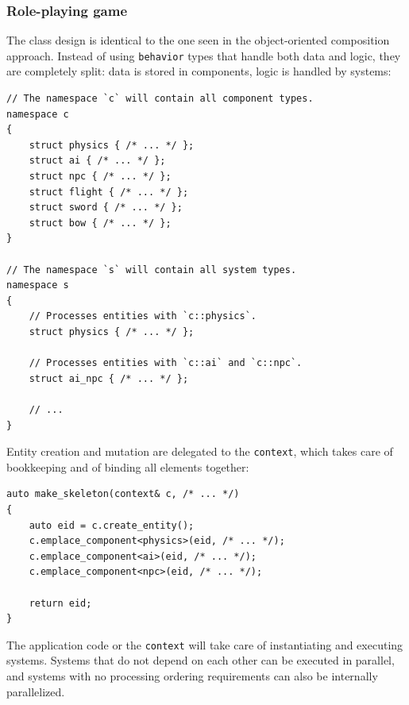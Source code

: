 \documentclass[twoside, 12pt, a4paper, openany]{book}
\begin{document}
\subsubsection{Role-playing game}\label{role-playing-game-3}

The class design is identical to the one seen in the object-oriented
composition approach. Instead of using
\texttt{behavior}
types that handle both data and logic, they are completely split: data
is stored in components, logic is handled by systems:

\begin{verbatim}
// The namespace `c` will contain all component types.
namespace c
{
    struct physics { /* ... */ };
    struct ai { /* ... */ };
    struct npc { /* ... */ };
    struct flight { /* ... */ };
    struct sword { /* ... */ };
    struct bow { /* ... */ };
}

// The namespace `s` will contain all system types.
namespace s
{
    // Processes entities with `c::physics`.
    struct physics { /* ... */ };

    // Processes entities with `c::ai` and `c::npc`.
    struct ai_npc { /* ... */ };

    // ...
}
\end{verbatim}

Entity creation and mutation are delegated to the
\texttt{context},
which takes care of bookkeeping and of binding all elements together:

\begin{verbatim}
auto make_skeleton(context& c, /* ... */)
{
    auto eid = c.create_entity();
    c.emplace_component<physics>(eid, /* ... */);
    c.emplace_component<ai>(eid, /* ... */);
    c.emplace_component<npc>(eid, /* ... */);

    return eid;
}
\end{verbatim}

The application code or the
\texttt{context}
will take care of instantiating and executing systems. Systems that do
not depend on each other can be executed in parallel, and systems with
no processing ordering requirements can also be internally parallelized.
\end{document}
